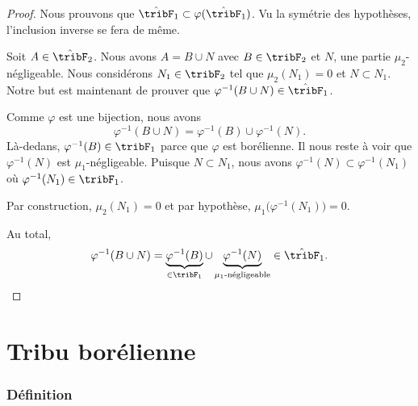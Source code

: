 \begin{proof}
    Nous prouvons que \( \hat\tribF_1\subset \varphi(\hat\tribF_1)\). Vu la symétrie des hypothèses, l'inclusion inverse se fera de même.

    Soit \( A\in\hat\tribF_2\). Nous avons \( A=B\cup N\) avec \( B\in \tribF_2\) et \( N\), une partie \( \mu_2\)-négligeable. Nous considérons \( N_1\in\tribF_2\) tel que \( \mu_2(N_1)=0\) et \( N\subset N_1\). Notre but est maintenant de prouver que \( \varphi^{-1}(B\cup N)\in \hat\tribF_1\).

    Comme \( \varphi\) est une bijection, nous avons
    \begin{equation}
        \varphi^{-1}(B\cup N)=\varphi^{-1}(B)\cup \varphi^{-1}(N).
    \end{equation}
    Là-dedans, \( \varphi^{-1}(B)\in \tribF_1\) parce que \( \varphi\) est borélienne. Il nous reste à voir que \( \varphi^{-1}(N)\) est \( \mu_1\)-négligeable. Puisque \( N\subset N_1\), nous avons \( \varphi^{-1}(N)\subset\varphi^{-1}(N_1)\) où \( \varphi^{-1}(N_1)\in\tribF_1\).

    Par construction, \( \mu_2(N_1)=0\) et par hypothèse, \( \mu_1\big( \varphi^{-1}(N_1) \big)=0\).

    Au total,
    \begin{equation}
        \varphi^{-1}(B\cup N)=\underbrace{\varphi^{-1}(B)}_{\in\tribF_1}\cup\underbrace{\varphi^{-1}(N)}_{\mu_1\text{-négligeable}}\in\hat\tribF_1.
    \end{equation}
\end{proof}

\section{Tribu borélienne}

\subsubsection{Définition}

